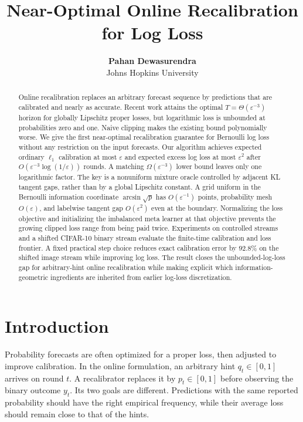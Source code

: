 \documentclass{article}
\title{Near-Optimal Online Recalibration for Log Loss}
\author{\textbf{Pahan Dewasurendra} \\ Johns Hopkins University}
\begin{document}
\maketitle

\begin{abstract}
Online recalibration replaces an arbitrary forecast sequence by predictions that are calibrated and nearly as accurate. Recent work attains the optimal $T=\Theta(\varepsilon^{-3})$ horizon for globally Lipschitz proper losses, but logarithmic loss is unbounded at probabilities zero and one. Naive clipping makes the existing bound polynomially worse. We give the first near-optimal recalibration guarantee for Bernoulli log loss without any restriction on the input forecasts. Our algorithm achieves expected ordinary $\ell_1$ calibration at most $\varepsilon$ and expected excess log loss at most $\varepsilon^2$ after $O(\varepsilon^{-3}\log(1/\varepsilon))$ rounds. A matching $\Omega(\varepsilon^{-3})$ lower bound leaves only one logarithmic factor. The key is a nonuniform mixture oracle controlled by adjacent KL tangent gaps, rather than by a global Lipschitz constant. A grid uniform in the Bernoulli information coordinate $\arcsin\sqrt p$ has $O(\varepsilon^{-1})$ points, probability mesh $O(\varepsilon)$, and labelwise tangent gap $O(\varepsilon^2)$ even at the boundary. Normalizing the loss objective and initializing the imbalanced meta learner at that objective prevents the growing clipped loss range from being paid twice. Experiments on controlled streams and a shifted CIFAR-10 binary stream evaluate the finite-time calibration and loss frontier. A fixed practical step choice reduces exact calibration error by $92.8\%$ on the shifted image stream while improving log loss. The result closes the unbounded-log-loss gap for arbitrary-hint online recalibration while making explicit which information-geometric ingredients are inherited from earlier log-loss discretization.
\end{abstract}

\section{Introduction}

Probability forecasts are often optimized for a proper loss, then adjusted to improve calibration. In the online formulation, an arbitrary hint $q_t\in[0,1]$ arrives on round $t$. A recalibrator replaces it by $p_t\in[0,1]$ before observing the binary outcome $y_t$. Its two goals are different. Predictions with the same reported probability should have the right empirical frequency, while their average loss should remain close to that of the hints.
\end{document}
